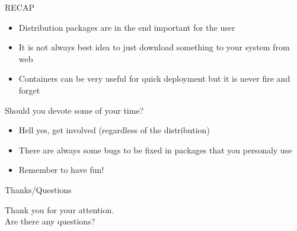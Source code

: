 \documentclass{beamer}
\begin{document}
\begin{frame}[t]{RECAP}
	\begin{itemize}
	\item Distribution packages are in the end important for the user
	\item It is not always best idea to just download something to your system from web
	\item Containers can be very useful for quick deployment but it is never fire and forget
	\end{itemize}
\end{frame}

\begin{frame}[t]{Should you devote some of your time?}
	\begin{itemize}
	\item Hell yes, get involved (regardless of the distribution)
    \item There are always some bugs to be fixed in packages that you personaly use
    \item Remember to have fun!
	\end{itemize}
\end{frame}

\begin{frame}{Thanks/Questions}
	\begin{center}
	Thank you for your attention.\\
	Are there any questions?
	\end{center}
\end{frame}
\end{document}
